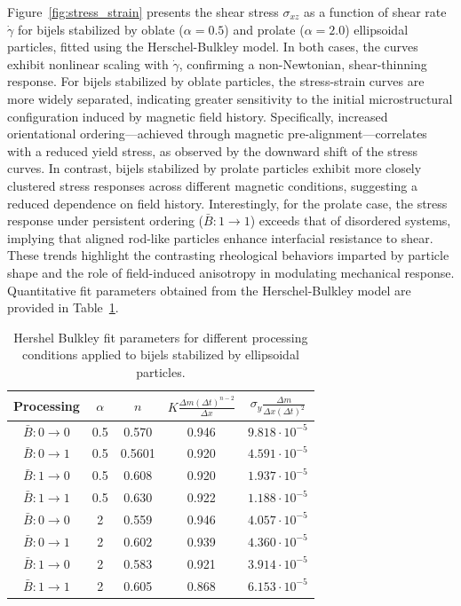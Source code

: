 Figure~\ref{fig:stress_strain} presents the shear stress $\sigma_{xz}$ as a function of shear rate $\dot{\gamma}$ for bijels stabilized by oblate ($\alpha = 0.5$) 
and prolate ($\alpha = 2.0$) ellipsoidal particles, fitted using the Herschel-Bulkley model. In both cases, the curves exhibit nonlinear scaling with $\dot{\gamma}$, 
confirming a non-Newtonian, shear-thinning response. For bijels stabilized by oblate particles, the stress-strain curves are more widely separated, indicating 
greater sensitivity to the initial microstructural configuration induced by magnetic field history. Specifically, increased orientational ordering—achieved through 
magnetic pre-alignment—correlates with a reduced yield stress, as observed by the downward shift of the stress curves. In contrast, bijels stabilized by prolate 
particles exhibit more closely clustered stress responses across different magnetic conditions, suggesting a reduced dependence on field history. Interestingly, 
for the prolate case, the stress response under persistent ordering ($\bar{B}:1 \rightarrow 1$) exceeds that of disordered systems, implying that aligned rod-like 
particles enhance interfacial resistance to shear. These trends highlight the contrasting rheological behaviors imparted by particle shape and the role of 
field-induced anisotropy in modulating mechanical response. Quantitative fit parameters obtained from the Herschel-Bulkley model are provided in 
Table~\ref{table:rheology_fit}.

\begin{table}[h!]
    \centering
    \renewcommand{\arraystretch}{1.5}  %
    \begin{tabular}{||c c c c c||} 
     \hline
     Processing & $\alpha$ & $n$ & $K \frac{\Delta m (\Delta t)^{n-2}}{\Delta x} $ & $\sigma_{y} \frac{\Delta m}{\Delta x (\Delta t)^2}$ \\ [0.5ex] 
     \hline\hline
     $\bar{B}: 0 \rightarrow 0$ & 0.5 & 0.570 & 0.946 & $9.818 \cdot 10^{-5}$ \\ 
     \hline
     $\bar{B}: 0 \rightarrow 1$ & 0.5 & 0.5601 & 0.920 & $4.591 \cdot 10^{-5}$ \\
     \hline
     $\bar{B}: 1 \rightarrow 0$ & 0.5 & 0.608 & 0.920 & $1.937 \cdot 10^{-5}$ \\
     \hline
     $\bar{B}: 1 \rightarrow 1$ & 0.5 & 0.630 & 0.922 & $1.188 \cdot 10^{-5}$ \\
     \hline
     $\bar{B}: 0 \rightarrow 0$ & 2 & 0.559 & 0.946 & $4.057 \cdot 10^{-5}$ \\
     \hline
     $\bar{B}: 0 \rightarrow 1$ & 2 & 0.602 & 0.939 & $4.360 \cdot 10^{-5}$ \\
     \hline
     $\bar{B}: 1 \rightarrow 0$ & 2 & 0.583 & 0.921 & $3.914 \cdot 10^{-5}$ \\
     \hline
     $\bar{B}: 1 \rightarrow 1$ & 2 & 0.605 & 0.868 & $6.153 \cdot 10^{-5}$ \\ [1ex] 
     \hline
    \end{tabular}
    \caption{Hershel Bulkley fit parameters for different processing conditions applied to bijels stabilized by ellipsoidal particles.}
    \label{table:rheology_fit}
\end{table}
 
